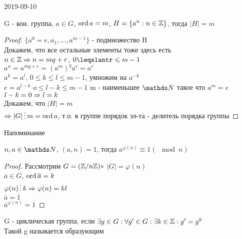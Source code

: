 \documentclass[main]{subfiles}
\begin{document}
	\begin{lect} {2019-09-10}

		\begin{consequence}
		    G - кон. группа, $a \in G$, $\mathop{\rm ord}\nolimits a = m$, $H=\{a^n:n \in \mathbb{Z}\}$, тогда $|H|=m$\\
		\end{consequence}

		\begin{proof}
		    $\{a^0=e,a_1,...,a^{m-1}\}$ - подмножество H\\
		    Докажем, что все остальные элементы тоже здесь есть\\
		    $n \in \mathbb{Z} \Rightarrow n=m q+r$, $0 \leqslantr \leqslant m-1$\\
		    $a^n=a^{m q+r}=(a^m)^q a^r=a^r$\\
		    $a^k=a^l$, $0 \leqslant k \leqslant l \leqslant m-1$, умножим на $a^{-k}$\\
		    $e=a^{l-k}$ $o \leqslant l-k \leqslant m-1$ m - наименьшее $\N$ такое что $a^m=e$\\
		    $l-k=0 \Rightarrow l=k$\\
		    Докажем, что $|H|=m$\\
		    $\Ra |G| \devides m=\ord a$, т.о. в группе порядок эл-та - делитель порядка группы
		\end{proof}

		Напоминание

		\begin{consequence}
		    $n,a \in \N$, $(a,n)=1$, тогда $a^{\varphi(n)} \equiv 1 (\mod n)$
		\end{consequence}

		\begin{proof}
		    Рассмотрим $G=(\mathbb{Z} / n \mathbb{Z})*$ $|G|=\varphi(n)$\\
		    $\overline{a} \in G$, $\mathop{\rm ord}\nolimits \overline{a}=k$\\
		    $\varphi(n) \devides k \Ra \varphi(n) = kl$\\
		    $\overline{a}=\overline{1}$\\
		    $\overline{a}^{\varphi(n)}=\overline{1}$
		\end{proof}

	\begin{definition}
	    G - циклическая группа, если $\exists g \in G: \forall g' \in G: \exists k \in \mathbb{Z}: g'=g^k$\\
	    Такой g называется образующим
	\end{definition}


\end{lect}
\end{document}

